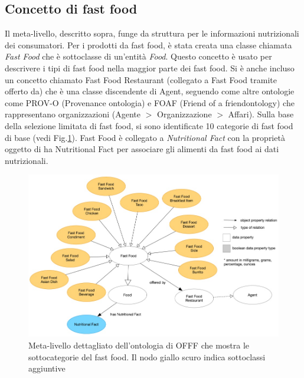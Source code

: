 \subsection{Concetto di fast food}
Il meta-livello, descritto sopra, funge da struttura per le informazioni nutrizionali dei consumatori. Per i prodotti da fast food, è stata creata una classe chiamata \emph{Fast Food} che è sottoclasse di un'entità \emph{Food}. Questo concetto è usato per descrivere i tipi di fast food nella maggior parte dei fast food. 
Si è anche incluso un concetto chiamato Fast Food Restaurant (collegato a Fast Food tramite offerto da) che è una classe discendente di Agent, seguendo come altre ontologie come PROV-O (Provenance ontologia) e FOAF (Friend of a friendontology) che rappresentano organizzazioni (Agente $>$ Organizzazione $>$ Affari). 
Sulla base della selezione limitata di fast food, si sono identificate 10 categorie di fast food di base (vedi Fig.\ref{fig:fastFood}). Fast Food è collegato a \emph{Nutritional Fact} con la proprietà oggetto di ha Nutritional Fact per associare gli alimenti da fast food ai dati nutrizionali.

\begin{figure}[H]
    \centering
    \includegraphics[width=\textwidth]{res/WS_02_Fast_Food_Category.jpg}
    \caption{Meta-livello dettagliato dell'ontologia di OFFF che mostra le sottocategorie del fast food. Il nodo giallo scuro indica sottoclassi aggiuntive}
     \label{fig:fastFood}
\end{figure}

